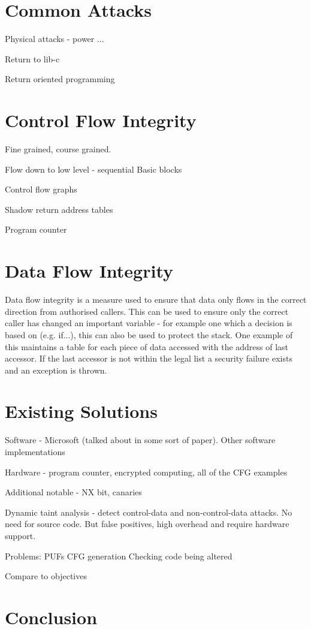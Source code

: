 \section{Common Attacks}

Physical attacks - power ...

Return to lib-c

Return oriented programming

\section{Control Flow Integrity}

Fine grained, course grained.

Flow down to low level - sequential
Basic blocks

Control flow graphs

Shadow return address tables

Program counter

\section{Data Flow Integrity}

Data flow integrity is a measure used to ensure that data only flows in the correct direction from authorised callers. This can be used to ensure only the correct caller has changed an important variable - for example one which a decision is based on (e.g. if...), this can also be used to protect the stack.
One example of this maintains a table for each piece of data accessed with the address of last accessor. If the last accessor is not within the legal list a security failure exists and an exception is thrown.

\section{Existing Solutions}

Software - Microsoft (talked about in some sort of paper).
Other software implementations

Hardware - program counter, encrypted computing, all of the CFG examples

Additional notable - NX bit, canaries

Dynamic taint analysis - detect control-data and non-control-data attacks. No need for source code. But false positives, high overhead and require hardware support.

Problems:
PUFs
CFG generation
Checking code being altered

Compare to objectives

\section{Conclusion}
